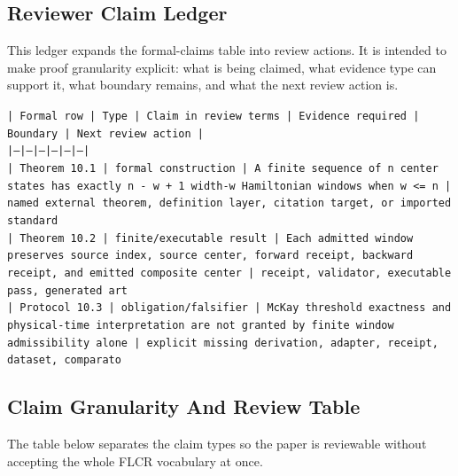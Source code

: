 \documentclass[11pt]{article}
\begin{document}
\subsection*{Reviewer Claim Ledger}

This ledger expands the formal-claims table into review actions. It is intended to make proof granularity explicit: what is being claimed, what evidence type can support it, what boundary remains, and what the next review action is.

\noindent\texttt{| Formal row | Type | Claim in review terms | Evidence required | Boundary | Next review action |}\\
\noindent\texttt{|---|---|---|---|---|---|}\\
\noindent\texttt{| Theorem 10.1 | formal construction | A finite sequence of n center states has exactly n - w + 1 width-w Hamiltonian windows when w <= n | named external theorem, definition layer, citation target, or imported standard }\\
\noindent\texttt{| Theorem 10.2 | finite/executable result | Each admitted window preserves source index, source center, forward receipt, backward receipt, and emitted composite center | receipt, validator, executable pass, generated art}\\
\noindent\texttt{| Protocol 10.3 | obligation/falsifier | McKay threshold exactness and physical-time interpretation are not granted by finite window admissibility alone | explicit missing derivation, adapter, receipt, dataset, comparato}\\

\subsection*{Claim Granularity And Review Table}

The table below separates the claim types so the paper is reviewable without accepting the whole FLCR vocabulary at once.
\end{document}

